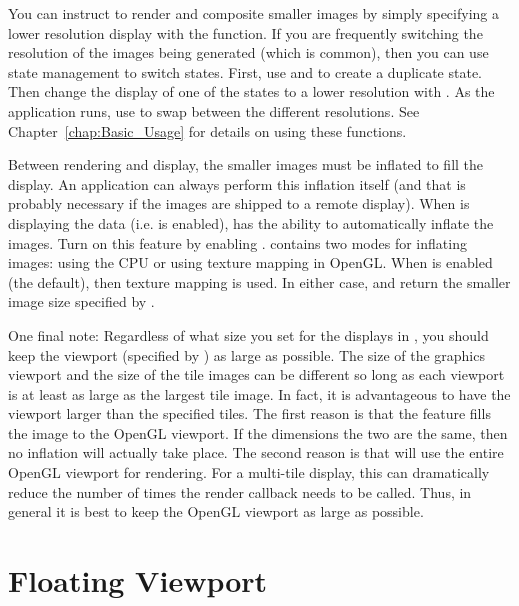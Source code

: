 You can instruct \IceT to render and composite smaller images by simply
specifying a lower resolution display with the 
function.  If you are frequently switching the resolution of the images
being generated (which is common), then you can use \IceT state management
to switch states.  First, use  and
 to create a duplicate state.  Then change the display
of one of the states to a lower resolution with .  As
the application runs, use  to swap between the
different resolutions.  See Chapter~\ref{chap:Basic_Usage} for details on
using these functions.

Between rendering and display, the smaller images must be inflated to fill
the display.  An application can always perform this inflation itself (and
that is probably necessary if the images are shipped to a remote display).
When \IceT is displaying the data (i.e.  is enabled),
\IceT has the ability to automatically inflate the images.  Turn on this
feature by enabling .  \IceT contains two
modes for inflating images: using the CPU or using texture mapping in
OpenGL.  When  is enabled
(the default), then texture mapping is used.  In either case,
 and  return the
smaller image size specified by .

One final note: Regardless of what size you set for the displays in
, you should keep the viewport (specified by
) as large as possible.  The size of the graphics
viewport and the size of the tile images can be different so long as each
viewport is at least as large as the largest tile image.  In fact, it is
advantageous to have the viewport larger than the specified tiles.  The
first reason is that the  feature fills the
image to the OpenGL viewport.  If the dimensions the two are the same, then
no inflation will actually take place.  The second reason is that \IceT
will use the entire OpenGL viewport for rendering.  For a multi-tile
display, this can dramatically reduce the number of times the render
callback needs to be called.  Thus, in general it is best to keep the
OpenGL viewport as large as possible.


\section{Floating Viewport}
\label{sec:Customizing_Compositing:Floating_Viewport}

